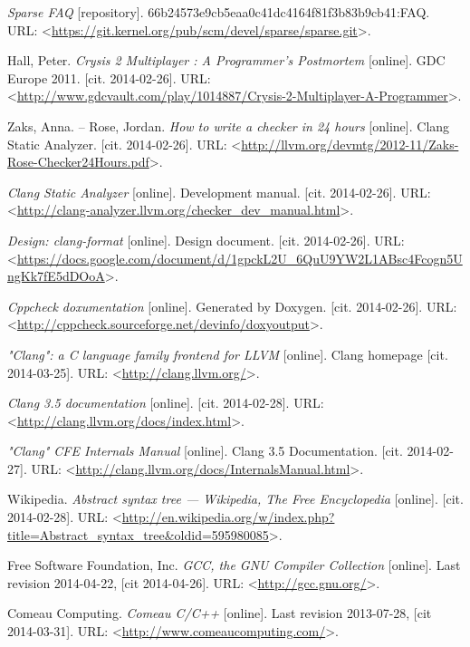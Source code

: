 \begin{thebibliography}{99}
	\emph{Sparse FAQ} [repository].
	66b24573e9cb5eaa0c41dc4164f81f3b83b9cb41:FAQ.
	URL: <\url{https://git.kernel.org/pub/scm/devel/sparse/sparse.git}>.
	
	{\sc Hall}, Peter.
	\emph{Crysis 2 Multiplayer : A Programmer's Postmortem} [online].
	GDC Europe 2011.
	[cit. 2014-02-26].
	URL: <\url{http://www.gdcvault.com/play/1014887/Crysis-2-Multiplayer-A-Programmer}>.
	
	{\sc Zaks}, Anna. -- {\sc Rose}, Jordan.
	\emph{How to write a checker in 24 hours} [online].
	Clang Static Analyzer.
	[cit. 2014-02-26].
	URL: <\url{http://llvm.org/devmtg/2012-11/Zaks-Rose-Checker24Hours.pdf}>.
	
	\emph{Clang Static Analyzer} [online].
	Development manual.
	[cit. 2014-02-26].
	URL: <\url{http://clang-analyzer.llvm.org/checker_dev_manual.html}>.
	
	\emph{Design: clang-format} [online].
	Design document.
	[cit. 2014-02-26].
	URL: <\url{https://docs.google.com/document/d/1gpckL2U_6QuU9YW2L1ABsc4Fcogn5UngKk7fE5dDOoA}>.
	
	\emph{Cppcheck doxumentation} [online].
	Generated by Doxygen.
	[cit. 2014-02-26].
	URL: <\url{http://cppcheck.sourceforge.net/devinfo/doxyoutput}>.
		
	\emph{"Clang": a C language family frontend for LLVM} [online].
	Clang homepage
	[cit. 2014-03-25].
	URL: <\url{http://clang.llvm.org/}>.
	
	\emph{Clang 3.5 documentation} [online].
	[cit. 2014-02-28].
	URL: <\url{http://clang.llvm.org/docs/index.html}>.

	\emph{"Clang" CFE Internals Manual} [online].
	Clang 3.5 Documentation.
	[cit. 2014-02-27].
	URL: <\url{http://clang.llvm.org/docs/InternalsManual.html}>.
	
	{\sc Wikipedia}.
	\emph{Abstract syntax tree --- {W}ikipedia{,} The Free Encyclopedia} [online].
	[cit. 2014-02-28].
	URL: <\url{http://en.wikipedia.org/w/index.php?title=Abstract_syntax_tree&oldid=595980085}>.

	{\sc Free Software Foundation, Inc}.
	\emph{GCC, the GNU Compiler Collection} [online].
	Last revision 2014-04-22, [cit 2014-04-26].
	URL: <\url{http://gcc.gnu.org/}>.

	{\sc Comeau Computing}.
	\emph{Comeau C/C++} [online].
	Last revision 2013-07-28, [cit 2014-03-31].
	URL: <\url{http://www.comeaucomputing.com/}>.


\end{thebibliography}
